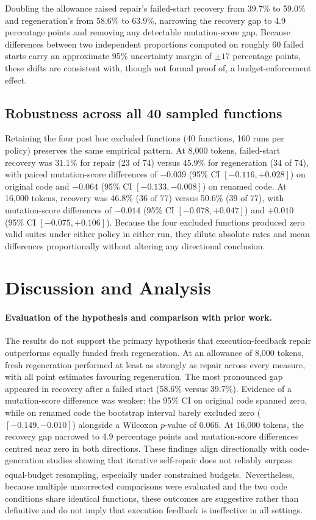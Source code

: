 \documentclass[11pt,a4paper]{article}
\newcommand{\ysjcite}[1]{\,\textsuperscript{\cite{#1}}}
\begin{document}
Doubling the allowance raised repair's failed-start recovery from 39.7\% to 59.0\% and regeneration's from 58.6\% to 63.9\%, narrowing the recovery gap to 4.9 percentage points and removing any detectable mutation-score gap. Because differences between two independent proportions computed on roughly 60 failed starts carry an approximate 95\% uncertainty margin of $\pm 17$ percentage points, these shifts are consistent with, though not formal proof of, a budget-enforcement effect.

\subsection{Robustness across all 40 sampled functions}\label{sec:robust}
Retaining the four post hoc excluded functions (40 functions, 160 runs per policy) preserves the same empirical pattern. At 8{,}000 tokens, failed-start recovery was 31.1\% for repair (23 of 74) versus 45.9\% for regeneration (34 of 74), with paired mutation-score differences of $-0.039$ (95\% CI $[-0.116, +0.028]$) on original code and $-0.064$ (95\% CI $[-0.133, -0.008]$) on renamed code. At 16{,}000 tokens, recovery was 46.8\% (36 of 77) versus 50.6\% (39 of 77), with mutation-score differences of $-0.014$ (95\% CI $[-0.078, +0.047]$) and $+0.010$ (95\% CI $[-0.075, +0.106]$). Because the four excluded functions produced zero valid suites under either policy in either run, they dilute absolute rates and mean differences proportionally without altering any directional conclusion.

\FloatBarrier
\section{Discussion and Analysis}\label{sec:disc}
\paragraph{Evaluation of the hypothesis and comparison with prior work.}
The results do not support the primary hypothesis that execution-feedback repair outperforms equally funded fresh regeneration. At an allowance of 8{,}000 tokens, fresh regeneration performed at least as strongly as repair across every measure, with all point estimates favouring regeneration. The most pronounced gap appeared in recovery after a failed start (58.6\% versus 39.7\%). Evidence of a mutation-score difference was weaker: the 95\% CI on original code spanned zero, while on renamed code the bootstrap interval barely excluded zero ($[-0.149, -0.010]$) alongside a Wilcoxon $p$-value of 0.066. At 16{,}000 tokens, the recovery gap narrowed to 4.9 percentage points and mutation-score differences centred near zero in both directions. These findings align directionally with code-generation studies showing that iterative self-repair does not reliably surpass equal-budget resampling, especially under constrained budgets.\ysjcite{olausson2024selfrepair} Nevertheless, because multiple uncorrected comparisons were evaluated and the two code conditions share identical functions, these outcomes are suggestive rather than definitive and do not imply that execution feedback is ineffective in all settings.
\end{document}
